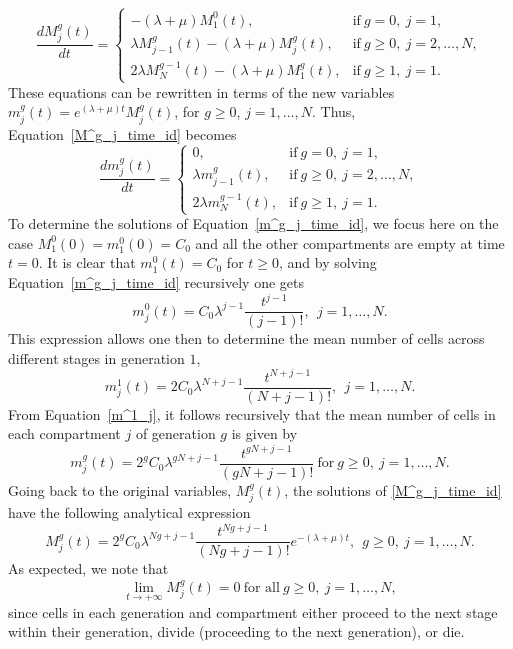 \documentclass[10pt]{article}
\numberwithin{equation}{section}
\begin{document}
\begin{equation} \label{M^g_j_time_id}
\frac{d M^g_j(t)}{dt}=
\begin{cases}
-(\lambda + \mu) M^0_1(t), & \text{if} \ g=0, \ j=1, \\
\lambda M^g_{j-1}(t) - (\lambda + \mu) M^g_j(t), & \text{if} \ g \ge 0, \ j=2, \ldots, N, \\
2 \lambda M^{g-1}_N(t) - (\lambda + \mu) M^g_1(t), & \text{if} \ g \ge 1, \ j=1.
\end{cases}
\end{equation}
These equations can be rewritten in terms of the new variables $m^g_j(t) = e^{(\lambda+\mu)t} M^g_j(t)$, for $g\ge0$, $j=1,\ldots,N$. Thus, Equation~\eqref{M^g_j_time_id} becomes
\begin{equation} \label{m^g_j_time_id}
\frac{d m^g_j(t)}{dt}=
\begin{cases}
0, & \text{if} \ g=0, \ j=1, \\
\lambda m^g_{j-1}(t), & \text{if} \ g \ge 0, \ j=2, \ldots, N, \\
2 \lambda m^{g-1}_N(t), & \text{if} \ g \ge 1, \ j=1.
\end{cases}
\end{equation}
To determine the solutions of Equation~\eqref{m^g_j_time_id}, we focus here on the case $M^0_1(0)=m^0_1(0)=C_0$ and all the other compartments are empty at time $t=0$. It is clear that $m^0_1(t)=C_0$ for $t\geq0$, and by solving Equation~\eqref{m^g_j_time_id} recursively one gets
\begin{equation*}
m^0_j(t) = C_0 \lambda^{j-1} \frac{t^{j-1}}{(j-1)!}, \ \ j=1, \ldots, N.
\end{equation*}
This expression allows one then to determine the mean number of cells across different stages in generation $1$, 
\begin{equation} \label{m^1_j}
m^1_j(t) = 2C_0\lambda^{N + j-1} \frac{t^{N+j-1}}{(N+j-1)!}, \ \ j=1, \ldots, N.
\end{equation}
From Equation~\eqref{m^1_j}, it follows recursively that the mean number of cells in each compartment $j$ of generation $g$ is given by
\begin{equation*}
m^g_j(t) = 2^g C_0 \lambda^{gN+j-1} \frac{t^{gN+j-1}}{(gN+j-1)!} \ \text{for} \ g \ge 0, \ j=1, \dots, N.
\end{equation*}
Going back to the original variables, $M^g_j(t)$, the solutions of \eqref{M^g_j_time_id} have the following analytical expression
\begin{equation}
    \label{M^g_j}
    M^g_j(t) = 2^g C_0 \lambda^{Ng+j-1} \frac{t^{Ng+j-1}}{(Ng+j-1)!} e^{-(\lambda+\mu)t}, \ \ g \ge 0, \ j=1,\ldots,N.
\end{equation}
As expected, we note that 
\begin{equation*}
    \lim_{t \to +\infty} M^g_j(t) = 0 \ \text{for all} \ g \ge 0, \ j=1,\ldots,N,
\end{equation*}
since cells in each generation and compartment either proceed to the next stage within their generation, divide (proceeding to the next generation), or die.
\end{document}
